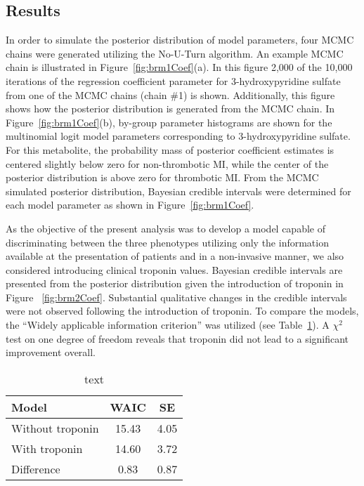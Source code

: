 \begin{DoubleSpace*}
\section{Results}
In order to simulate the posterior distribution of model parameters, four MCMC chains were generated utilizing the No-U-Turn algorithm. An example MCMC chain is illustrated in Figure~\ref{fig:brm1Coef}(a). In this figure 2,000 of the 10,000 iterations of the regression coefficient parameter for 3-hydroxypyridine sulfate from one of the MCMC chains (chain \#1) is shown. Additionally, this figure shows how the posterior distribution is generated from the MCMC chain. In Figure~\ref{fig:brm1Coef}(b), by-group parameter histograms are shown for the multinomial logit model parameters corresponding to  3-hydroxypyridine sulfate. For this metabolite, the probability mass of posterior coefficient estimates is centered slightly below zero for non-thrombotic MI, while the center of the posterior distribution is above zero for thrombotic MI. From the MCMC simulated posterior distribution, Bayesian credible intervals were determined for each model parameter as shown in Figure~\ref{fig:brm1Coef}. 

As the objective of the present analysis was to develop a model capable of discriminating between the three phenotypes utilizing only the information available at the presentation of patients and in a non-invasive manner, we also considered introducing clinical troponin values. Bayesian credible intervals are presented from the posterior distribution given the introduction of troponin in Figure ~\ref{fig:brm2Coef}. Substantial qualitative changes in the credible intervals were not observed following the introduction of troponin. To compare the models, the ``Widely applicable information criterion'' was utilized (see Table~\ref{tab:modelComp}). A $\chi^2$ test on one degree of freedom reveals that troponin did not lead to a significant improvement overall. 

\begin{table}[H]
	\centering
	 	\caption{text}
	 	\label{tab:modelComp}
	\begin{tabular}{lcc}
		\hline
       Model & WAIC  & SE \\
       \hline
       Without troponin & 15.43 & 4.05 \\ 
       With troponin & 14.60 & 3.72 \\
       Difference & 0.83 & 0.87 \\
       \hline
	\end{tabular}
\end{table}

\end{DoubleSpace*}

